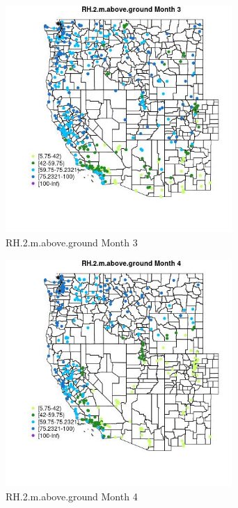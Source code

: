 \begin{figure} 
\centering  
\includegraphics[width=0.77\textwidth]{Code_Outputs/Report_ML_input_PM25_Step4_part_e_de_duplicated_aves_compiled_2019-05-18wNAs_MapObsMo3RH2maboveground.jpg} 
\caption{\label{fig:Report_ML_input_PM25_Step4_part_e_de_duplicated_aves_compiled_2019-05-18wNAsMapObsMo3RH2maboveground}RH.2.m.above.ground Month 3} 
\end{figure} 
 

\begin{figure} 
\centering  
\includegraphics[width=0.77\textwidth]{Code_Outputs/Report_ML_input_PM25_Step4_part_e_de_duplicated_aves_compiled_2019-05-18wNAs_MapObsMo4RH2maboveground.jpg} 
\caption{\label{fig:Report_ML_input_PM25_Step4_part_e_de_duplicated_aves_compiled_2019-05-18wNAsMapObsMo4RH2maboveground}RH.2.m.above.ground Month 4} 
\end{figure} 
 

